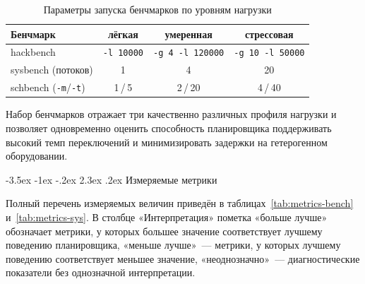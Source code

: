\documentclass[14pt, oneside]{extbook}
\makeatletter
\renewcommand\section{\@startsection {section}{1}{\z@}%
                                   {-3.5ex \@plus -1ex \@minus -.2ex}%
                                   {2.3ex \@plus.2ex}%
                                   {\normalfont\fontsize{16}{20}\selectfont\bfseries}}
\makeatother
\begin{document}
        \begin{table}[h]
                \centering
                \caption{Параметры запуска бенчмарков по уровням нагрузки}
                \label{tab:bench-params}
                \vspace{0.4em}
                \begin{tabular}{|l|c|c|c|}
                        \hline
                        Бенчмарк & лёгкая & умеренная & стрессовая \\
                        \hline
                        hackbench & \texttt{-l 10000}
                                  & \texttt{-g 4 -l 120000}
                                  & \texttt{-g 10 -l 50000} \\
                        sysbench (потоков) & 1 & 4 & 20 \\
                        schbench (\texttt{-m}/\texttt{-t})
                                  & 1\,/\,5 & 2\,/\,20 & 4\,/\,40 \\
                        \hline
                \end{tabular}
        \end{table}

        Набор бенчмарков отражает три качественно различных
        профиля нагрузки и позволяет одновременно оценить
        способность планировщика поддерживать высокий темп
        переключений и минимизировать задержки на гетерогенном
        оборудовании.


\section{Измеряемые метрики}
\label{sec:metrics}

        Полный перечень измеряемых величин приведён в
        таблицах~\ref{tab:metrics-bench} и~\ref{tab:metrics-sys}.
        В столбце «Интерпретация» пометка «больше лучше»
        обозначает метрики, у которых большее значение
        соответствует лучшему поведению планировщика, «меньше
        лучше»~--- метрики, у которых лучшему поведению
        соответствует меньшее значение, «неоднозначно»~---
        диагностические показатели без однозначной интерпретации.
\end{document}
